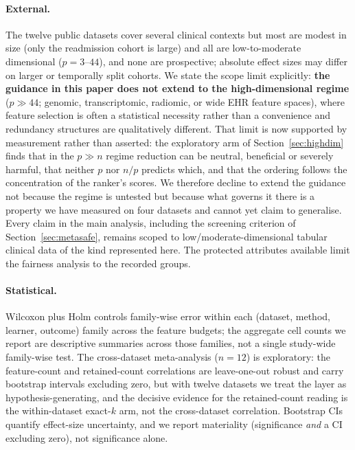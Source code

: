 \documentclass[fleqn,10pt]{wlscirep}
\begin{document}
\paragraph{External.} The twelve public datasets cover several clinical contexts but most are modest
in size (only the readmission cohort is large) and all are low-to-moderate dimensional
($p=3$--$44$), and none are prospective; absolute effect sizes may differ on larger or temporally
split cohorts. We state the scope limit explicitly: \textbf{the guidance in this paper does not
extend to the high-dimensional regime} ($p\gg44$; genomic, transcriptomic, radiomic, or wide EHR
feature spaces), where feature selection is often a statistical necessity rather than a convenience
and redundancy structures are qualitatively different. That limit is now supported by measurement
rather than asserted: the exploratory arm of Section~\ref{sec:highdim} finds that in the
$p\gg n$ regime reduction can be neutral, beneficial or severely harmful, that neither $p$ nor
$n/p$ predicts which, and that the ordering follows the concentration of the ranker's scores. We
therefore decline to extend the guidance not because the regime is untested but because what governs
it there is a property we have measured on four datasets and cannot yet claim to generalise. Every
claim in the main analysis, including the screening criterion of Section~\ref{sec:metasafe}, remains
scoped to low/moderate-dimensional tabular clinical data of the kind represented here. The protected attributes available limit the fairness analysis
to the recorded groups.

\paragraph{Statistical.} Wilcoxon plus Holm controls family-wise error within each
(dataset, method, learner, outcome) family across the feature budgets; the aggregate cell counts we
report are descriptive summaries across those families, not a single study-wide family-wise test. The
cross-dataset meta-analysis ($n=12$) is exploratory: the feature-count and retained-count
correlations are leave-one-out robust and carry bootstrap intervals excluding zero, but with twelve
datasets we treat the layer as hypothesis-generating, and the decisive evidence for the retained-count
reading is the within-dataset exact-$k$ arm, not the cross-dataset correlation. Bootstrap CIs quantify
effect-size uncertainty, and we report materiality (significance \emph{and} a CI excluding zero), not
significance alone.
\end{document}
